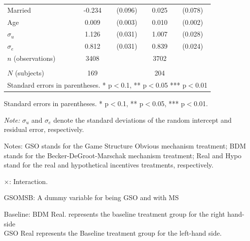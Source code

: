 \documentclass[12pt]{article}
\newcommand{\sym}[1]{\rlap{$^{#1}$}}
\begin{document}
\begin{table}[H]
{\begin{tabular}{l*{2}{cc}}
Married     &      -0.234\sym{**} &     (0.096)&       0.025         &     (0.078)\\
Age         &       0.009\sym{***}&     (0.003)&       0.010\sym{***}&     (0.002)\\
$\sigma_u$     &       1.126\sym{***}&     (0.031)&       1.007\sym{***}&     (0.028)\\
$\sigma_e$     &       0.812\sym{***}&     (0.031)&       0.839\sym{***}&     (0.024)\\
\(n\) (observations)      &        3408         &            &        3702         &            \\
       &            \\
\(N\) (subjects)      &        169         &            &        204         &            \\
\multicolumn{5}{l}{\footnotesize Standard errors in parentheses. * p$<$0.1, ** p$<$0.05 *** p$<$0.01}\\
\end{tabular}
}



\begin{tablenotes}
            \footnotesize
            \item Standard errors in parentheses. * p$<$0.1, ** p$<$0.05, *** p$<$0.01.
            \item \textit{Note:} $\sigma_u$ and $\sigma_e$ denote the standard deviations of the random intercept and residual error, respectively.
            \item Notes: GSO stands for the Game Structure Obvious mechanism treatment; BDM stands for the Becker-DeGroot-Marschak mechanism treatment; Real and Hypo stand for the real and hypothetical incentives treatments, respectively.
           \item $\times$: Interaction.
           \item GSOMSB: A dummy variable for being GSO and with MS
           \item Baseline: BDM Real. represents the baseline treatment group for the right hand-side \\
           GSO Real represents the Baseline treatment group for the left-hand side.
        \end{tablenotes}
\end{table}




\clearpage
\end{document}
